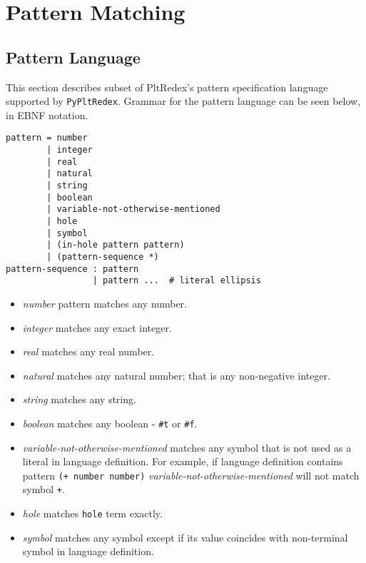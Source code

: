 \chapter{Pattern Matching}

\section{Pattern Language}

This section describes subset of PltRedex's pattern specification language supported by \texttt{PyPltRedex}. Grammar for the pattern language can be seen below, in EBNF notation. 

\begin{lstlisting}
pattern = number 
        | integer 
		| real 
		| natural 
		| string 
		| boolean 
		| variable-not-otherwise-mentioned 
		| hole 
		| symbol
        | (in-hole pattern pattern)
        | (pattern-sequence *) 
pattern-sequence : pattern 
                 | pattern ...  # literal ellipsis
\end{lstlisting}

\begin{itemize}
\item
\textit{number} pattern matches any number.

\item
\textit{integer} matches any exact integer. 

\item
\textit{real} matches any real number.

\item
\textit{natural} matches any natural number; that is any non-negative integer.

\item
\textit{string} matches any string.

\item
\textit{boolean} matches any boolean - \texttt{\#t} or \texttt{\#f}.

\item
\textit{variable-not-otherwise-mentioned} matches any symbol that is not used as a literal in language definition. For example, if language definition contains pattern \texttt{(+ number number)} \textit{variable-not-otherwise-mentioned} will not match symbol \texttt{+}.

\item
\textit{hole} matches \texttt{hole} term exactly.

\item
\textit{symbol} matches any symbol except if its value coincides with non-terminal symbol in language definition.
\end{itemize}

